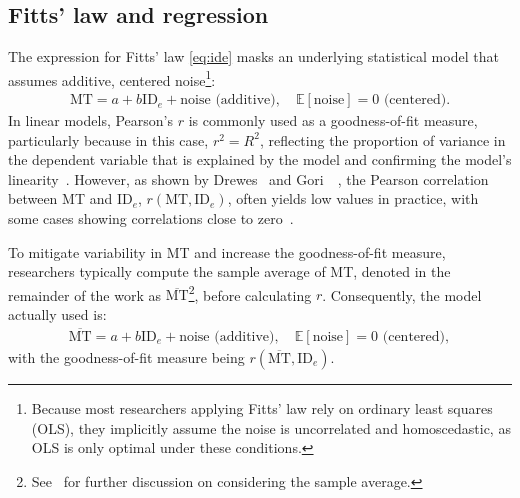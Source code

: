 \documentclass[manuscript,review,anonymous]{acmart}
\newcommand{\mmt}{\ensuremath{\overline{\text{MT}}}\xspace}
\newcommand{\ide}{\ensuremath{{\text{ID}_e}}\xspace}
\begin{document}




\subsection{Fitts' law and regression \label{subs:rw::fitts}}
The expression for Fitts' law \autoref{eq:ide} masks an underlying statistical model that assumes additive, centered noise\footnote{Because most researchers applying Fitts' law rely on ordinary least squares (OLS), they implicitly assume the noise is uncorrelated and homoscedastic, as OLS is only optimal under these conditions.}:
\begin{align} \text{MT} = a + b\ide + \text{noise (additive)}, \quad \mathbb{E}[\text{noise}] = 0 \text{ (centered)}. \end{align}
In linear models, Pearson's $r$ is commonly used as a goodness-of-fit measure, particularly because in this case, $r^2 = R^2$, reflecting the proportion of variance in the dependent variable that is explained by the model and confirming the model’s linearity~\cite{lee1988}. However, as shown by Drewes~\cite{drewes2013} and Gori~\etal~\cite{gori2018chi}, the Pearson correlation between MT and \ide, $r(\text{MT}, \ide)$, often yields low values in practice, with some cases showing correlations close to zero~\cite{gori2018tochi}.

To mitigate variability in MT and increase the goodness-of-fit measure, researchers typically compute the sample average of MT, denoted in the remainder of the work as \mmt\footnote{See~\cite{gori2017two} for further discussion on considering the sample average.}, before calculating $r$. Consequently, the model actually used is:
\begin{align}
	\mmt = a + b\ide + \text{noise (additive)}, \quad \mathbb{E}[\text{noise}] = 0 \text{ (centered)}, \label{eq:mmt}
\end{align}
with the goodness-of-fit measure being $r(\mmt, \ide)$.
\end{document}
